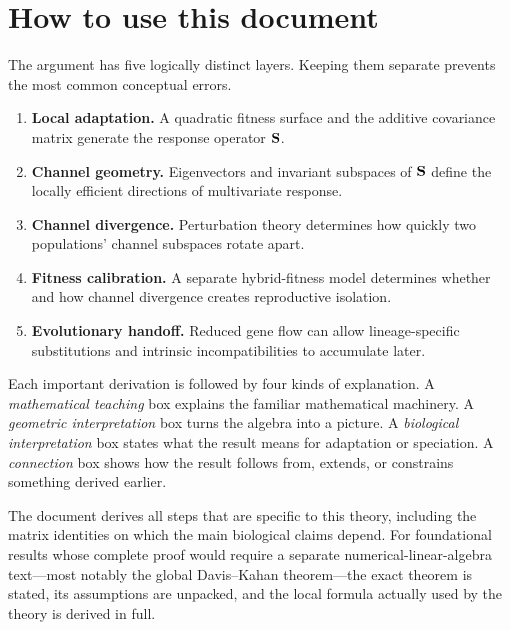\chapter*{How to use this document}

The argument has five logically distinct layers. Keeping them separate prevents the most common conceptual errors.

\begin{enumerate}[leftmargin=1.6em]
\item \textbf{Local adaptation.} A quadratic fitness surface and the additive covariance matrix generate the response operator \(\mathbf{S}\).
\item \textbf{Channel geometry.} Eigenvectors and invariant subspaces of \(\mathbf{S}\) define the locally efficient directions of multivariate response.
\item \textbf{Channel divergence.} Perturbation theory determines how quickly two populations' channel subspaces rotate apart.
\item \textbf{Fitness calibration.} A separate hybrid-fitness model determines whether and how channel divergence creates reproductive isolation.
\item \textbf{Evolutionary handoff.} Reduced gene flow can allow lineage-specific substitutions and intrinsic incompatibilities to accumulate later.
\end{enumerate}

Each important derivation is followed by four kinds of explanation. A \emph{mathematical teaching} box explains the familiar mathematical machinery. A \emph{geometric interpretation} box turns the algebra into a picture. A \emph{biological interpretation} box states what the result means for adaptation or speciation. A \emph{connection} box shows how the result follows from, extends, or constrains something derived earlier.

\begin{cautionbox}[title={What ``all derivation steps'' means here}]
The document derives all steps that are specific to this theory, including the matrix identities on which the main biological claims depend. For foundational results whose complete proof would require a separate numerical-linear-algebra text---most notably the global Davis--Kahan theorem---the exact theorem is stated, its assumptions are unpacked, and the local formula actually used by the theory is derived in full.
\end{cautionbox}

